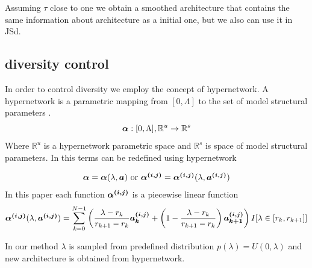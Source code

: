 \documentclass{article}
\begin{document}
Assuming $\tau$ close to one we obtain a smoothed architecture that contains the same information about architecture as a initial one, but we also can use it in JSd.

\subsection{diversity control}

In order to control diversity we employ the concept of hypernetwork. A hypernetwork is a parametric mapping from $[0, \Lambda]$ to the set of model structural parameters \citep{darts-cc}.
$$
\mbox{\boldmath{$\alpha$}} : [0, \Lambda], \mathbb{R}^u \to \mathbb{R}^s
$$
Where $\mathbb{R}^u$ is a hypernetwork parametric space and $\mathbb{R}^s$ is space of model structural parameters. In this terms \mbox{\boldmath{$\alpha$}} can be redefined using hypernetwork

$$
\mbox{\boldmath{$\alpha$}} = \mbox{\boldmath{$\alpha$}}(\lambda, \mbox{\boldmath{$a$}}) \text{ or } \mbox{\boldmath{$\alpha^{(i, j)}$}} = \mbox{\boldmath{$\alpha^{(i, j)}$}}(\lambda, \mbox{\boldmath{$a^{(i, j)}$}})
$$
In this paper each function $\mbox{\boldmath{$\alpha^{(i, j)}$}}$ is a piecewise linear function
$$
\mbox{\boldmath{$\alpha^{(i, j)}$}}(\lambda, \mbox{\boldmath{$a^{(i, j)}$}}) = \sum_{k=0}^{N-1} \left( \frac{\lambda - r_k}{r_{k + 1} - r_k} \mbox{\boldmath{$a_k^{(i, j)}$}} + \left(1 - \frac{\lambda - r_k}{r_{k + 1} - r_k}\right) \mbox{\boldmath{$a_{k + 1}^{(i, j)}$}} \right) I[\lambda \in [r_k, r_{k+1}]]
$$

In our method $\lambda$ is sampled from predefined distribution $p(\lambda) = U(0, \lambda)$ and new architecture is obtained from hypernetwork.





\end{document}
